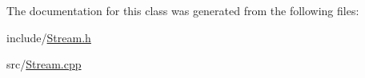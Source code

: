 The documentation for this class was generated from the following files\-:\begin{DoxyCompactItemize}
\item 
include/\hyperlink{Stream_8h}{Stream.\-h}\item 
src/\hyperlink{Stream_8cpp}{Stream.\-cpp}\end{DoxyCompactItemize}
